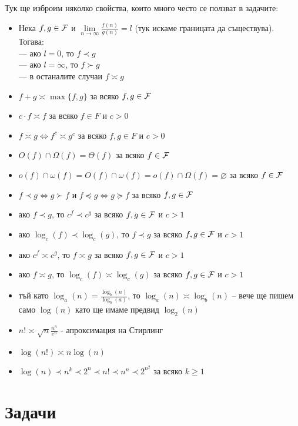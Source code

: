 Тук ще изброим няколко свойства, които много често се ползват в задачите:
\begin{itemize}
  \item Нека $f, g \in \mathcal{F}$ и $\lim\limits_{n \rightarrow \infty} \frac{f(n)}{g(n)} = l$ (тук искаме границата да съществува).
        Тогава: \\
        --- ако $l = 0$, то $f \prec g$ \\
        --- ако $l = \infty$, то $f \succ g$ \\
        --- в останалите случаи $f \asymp g$
  \item $f + g \asymp \max\{f, g\}$ за всяко $f, g \in \mathcal{F}$
  \item $c \cdot f \asymp f$ за всяко $f \in F$ и $c > 0$
  \item $f \asymp g \iff f^c \asymp g^c$ за всяко $f, g \in F$ и $c > 0$
  \item $O(f) \cap \Omega(f) = \Theta(f)$ за всяко $f \in \mathcal{F}$
  \item $o(f) \cap \omega(f) = O(f) \cap \omega(f) = o(f) \cap \Omega(f) = \varnothing$ за всяко $f \in \mathcal{F}$
  \item $f \prec g \iff g \succ f$ и $f \preceq g \iff g \succeq f$ за всяко $f, g \in \mathcal{F}$
  \item ако $f \prec g$, то $c^f \prec c^g$ за всяко $f, g \in \mathcal{F}$ и $c > 1$
  \item ако $\log_c(f) \prec \log_c(g)$, то $f \prec g$ за всяко $f, g \in \mathcal{F}$ и $c > 1$
  \item ако $c^f \asymp c^g$, то $f \asymp g$ за всяко $f, g \in \mathcal{F}$ и $c > 1$
  \item ако $f \asymp g$, то $\log_c(f) \asymp \log_c(g)$ за всяко $f, g \in \mathcal{F}$ и $c > 1$
  \item тъй като $\log_a(n) = \frac{\log_b(n)}{\log_b(a)}$, то $\log_a(n) \asymp \log_b(n)$ -- вече ще пишем само $\log(n)$ като ще имаме предвид $\log_2(n)$
  \item $n! \asymp \sqrt{n} \frac{n^n}{e^n}$ - апроксимация на Стирлинг
  \item $\log(n!) \asymp n \log(n)$
  \item $\log(n) \prec n^k \prec 2^n \prec n! \prec n^n \prec 2^{n^2}$ за всяко $k \geq 1$
\end{itemize}

\section{Задачи}

